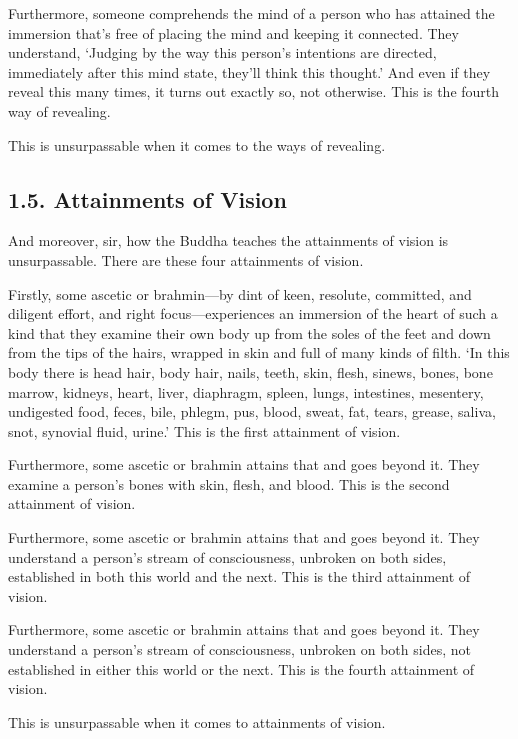 \documentclass[12pt,openany]{book}%
\begin{document}
Furthermore, someone comprehends the mind of a person who has attained the immersion that’s free of placing the mind and keeping it connected. They understand, ‘Judging by the way this person’s intentions are directed, immediately after this mind state, they’ll think this thought.’ And even if they reveal this many times, it turns out exactly so, not otherwise. This is the fourth way of revealing. 

This is unsurpassable when it comes to the ways of revealing. 

\subsection*{1.5. Attainments of Vision }

And moreover, sir, how the Buddha teaches the attainments of vision is unsurpassable. There are these four attainments of vision. 

Firstly, some ascetic or brahmin—by dint of keen, resolute, committed, and diligent effort, and right focus—experiences an immersion of the heart of such a kind that they examine their own body up from the soles of the feet and down from the tips of the hairs, wrapped in skin and full of many kinds of filth. ‘In this body there is head hair, body hair, nails, teeth, skin, flesh, sinews, bones, bone marrow, kidneys, heart, liver, diaphragm, spleen, lungs, intestines, mesentery, undigested food, feces, bile, phlegm, pus, blood, sweat, fat, tears, grease, saliva, snot, synovial fluid, urine.’ This is the first attainment of vision. 

Furthermore, some ascetic or brahmin attains that and goes beyond it. They examine a person’s bones with skin, flesh, and blood. This is the second attainment of vision. 

Furthermore, some ascetic or brahmin attains that and goes beyond it. They understand a person’s stream of consciousness, unbroken on both sides, established in both this world and the next. This is the third attainment of vision. 

Furthermore, some ascetic or brahmin attains that and goes beyond it. They understand a person’s stream of consciousness, unbroken on both sides, not established in either this world or the next. This is the fourth attainment of vision. 

This is unsurpassable when it comes to attainments of vision. 
\end{document}
